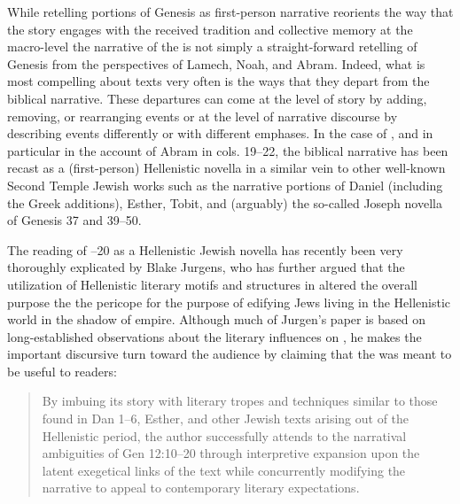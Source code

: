  While retelling portions of Genesis as first-person narrative reorients the way that the story engages with the received tradition and collective memory at the macro-level the narrative of the \ga is not simply a straight-forward retelling of Genesis from the perspectives of Lamech, Noah, and Abram. Indeed, what is most compelling about \rwb texts very often is the ways that they depart from the biblical narrative. These departures can come at the level of story by adding, removing, or rearranging events or at the level of narrative discourse by describing events differently or with different emphases. In the case of \ga, and in particular in the account of Abram in cols. 19--22, the biblical narrative has been recast as a (first-person) Hellenistic novella in a similar vein to other well-known Second Temple Jewish works such as the narrative portions of Daniel (including the Greek additions), Esther, Tobit, and (arguably) the so-called Joseph novella of Genesis 37 and 39--50.\autocites*[See especially Lawrence Wills work on the Jewish novels and novellas in antiquity:][]{wills2002}[as well as his important earlier works:][]{wills1995}[and][]{wills1990}

 The reading of --20 as a Hellenistic Jewish novella has recently been very thoroughly explicated by Blake Jurgens, who has further argued that the utilization of Hellenistic literary motifs and structures in \ga altered the overall purpose the the pericope for the purpose of edifying Jews living in the Hellenistic world in the shadow of empire.\autocite{jurgens_jsj2018} Although much of Jurgen's paper is based on long-established observations about the literary influences on \ga, he makes the important discursive turn toward the audience by claiming that the \ga was meant to be useful to readers:

 \begin{quote} By imbuing its story with literary tropes and techniques similar to those found in Dan 1--6, Esther, and other Jewish texts arising out of the Hellenistic period, the author successfully attends to the narratival ambiguities of Gen 12:10--20 through interpretive expansion upon the latent exegetical links of the text while concurrently modifying the narrative to appeal to contemporary literary expectations.\autocite[27]{jurgens_jsj2018} \end{quote}

